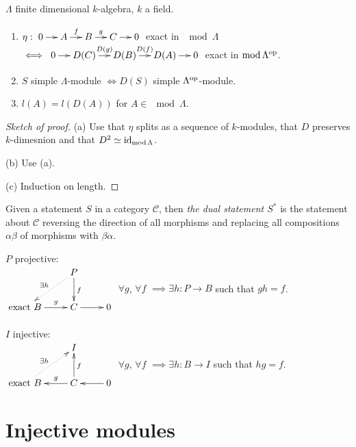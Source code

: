 \begin{lem}
$\Lambda$ finite dimensional $k$-algebra, $k$ a field.
\begin{enumerate}[\rm(a)]
\item $\eta: \xymatrix@C-1pc{0 \ar[r] & A \ar[r]^f & B \ar[r]^g & C \ar[r] & 0}$ exact in $\mod\Lambda$\\
$\iff \xymatrix@C-1pc{0 \ar[r] & D(C) \ar[r]^{D(g)} & D(B) \ar[r]^{D(f)} & D(A) \ar[r] & 0}$ exact in $\operatorname{mod}\nolimits\Lambda^{{\operatorname{op}\nolimits}}$.

\item $S$ simple $\Lambda$-module $\iff D(S)$ simple $\Lambda^{{\operatorname{op}\nolimits}}$-module.

\item $l(A) = l(D(A))$ for $A \in \mod\Lambda$. 
\end{enumerate}
\end{lem}
\begin{proof}[Sketch of proof]
(a) Use that $\eta$ splits as a sequence of $k$-modules, that $D$ preserves $k$-dimesnion and that $D^2 \simeq \operatorname{id}\nolimits_{\operatorname{mod}\nolimits\Lambda}$.

(b) Use (a).

(c) Induction on length.
\end{proof}

Given a statement $S$ in a category $\mathcal{C}$, then \emph{the
  dual statement $S^*$} is the statement about $\mathcal{C}$ reversing
the direction of all morphisms and replacing all compositions
$\alpha\beta$ of morphisms with $\beta\alpha$. 

\begin{exam}\[\]
$P$ projective:\\
$\vcenter{\xymatrix{
&P \ar@{.>}[dl]_{\exists h} \ar[d]^f\\
\text{exact } B \ar[r]^-g & C \ar[r] & 0
}}$ $\forall g$, $\forall f$ $\implies \exists h\colon P \to B$ such that $gh=f$.\\
\\
$I$ injective:\\
$\vcenter{\xymatrix{
&I \ar@{<.}[dl]_{\exists h} \ar@{<-}[d]^f\\
\text{exact } B \ar@{<-}[r]^-g & C \ar@{<-}[r] & 0
}}$ $\forall g$, $\forall f$ $\implies \exists h\colon B \to I$ such that $hg=f$.
\end{exam} 


\section{Injective modules}

